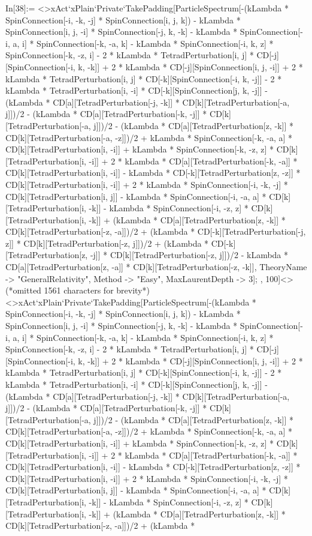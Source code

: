 In[38]:= <>xAct`xPlain`Private`TakePadding[ParticleSpectrum[-(kLambda * SpinConnection[-i, -k, -j] * SpinConnection[i, j, k]) - kLambda * SpinConnection[i, j, -i] * SpinConnection[-j, k, -k] - kLambda * SpinConnection[-i, a, i] * SpinConnection[-k, -a, k] - kLambda * SpinConnection[-i, k, z] * SpinConnection[-k, -z, i] - 2 * kLambda * TetradPerturbation[i, j] * CD[-j][SpinConnection[-i, k, -k]] + 2 * kLambda * CD[-j][SpinConnection[i, j, -i]] + 2 * kLambda * TetradPerturbation[i, j] * CD[-k][SpinConnection[-i, k, -j]] - 2 * kLambda * TetradPerturbation[i, -i] * CD[-k][SpinConnection[j, k, -j]] - (kLambda * CD[a][TetradPerturbation[-j, -k]] * CD[k][TetradPerturbation[-a, j]])/2 - (kLambda * CD[a][TetradPerturbation[-k, -j]] * CD[k][TetradPerturbation[-a, j]])/2 - (kLambda * CD[a][TetradPerturbation[z, -k]] * CD[k][TetradPerturbation[-a, -z]])/2 + kLambda * SpinConnection[-k, -a, a] * CD[k][TetradPerturbation[i, -i]] + kLambda * SpinConnection[-k, -z, z] * CD[k][TetradPerturbation[i, -i]] + 2 * kLambda * CD[a][TetradPerturbation[-k, -a]] * CD[k][TetradPerturbation[i, -i]] - kLambda * CD[-k][TetradPerturbation[z, -z]] * CD[k][TetradPerturbation[i, -i]] + 2 * kLambda * SpinConnection[-i, -k, -j] * CD[k][TetradPerturbation[i, j]] - kLambda * SpinConnection[-i, -a, a] * CD[k][TetradPerturbation[i, -k]] - kLambda * SpinConnection[-i, -z, z] * CD[k][TetradPerturbation[i, -k]] + (kLambda * CD[a][TetradPerturbation[z, -k]] * CD[k][TetradPerturbation[-z, -a]])/2 + (kLambda * CD[-k][TetradPerturbation[-j, z]] * CD[k][TetradPerturbation[-z, j]])/2 + (kLambda * CD[-k][TetradPerturbation[z, -j]] * CD[k][TetradPerturbation[-z, j]])/2 - kLambda * CD[a][TetradPerturbation[z, -a]] * CD[k][TetradPerturbation[-z, -k]], TheoryName -> "GeneralRelativity", Method -> "Easy", MaxLaurentDepth -> 3]; , 100]<>(*omitted 1561 characters for brevity*)<>xAct`xPlain`Private`TakePadding[ParticleSpectrum[-(kLambda * SpinConnection[-i, -k, -j] * SpinConnection[i, j, k]) - kLambda * SpinConnection[i, j, -i] * SpinConnection[-j, k, -k] - kLambda * SpinConnection[-i, a, i] * SpinConnection[-k, -a, k] - kLambda * SpinConnection[-i, k, z] * SpinConnection[-k, -z, i] - 2 * kLambda * TetradPerturbation[i, j] * CD[-j][SpinConnection[-i, k, -k]] + 2 * kLambda * CD[-j][SpinConnection[i, j, -i]] + 2 * kLambda * TetradPerturbation[i, j] * CD[-k][SpinConnection[-i, k, -j]] - 2 * kLambda * TetradPerturbation[i, -i] * CD[-k][SpinConnection[j, k, -j]] - (kLambda * CD[a][TetradPerturbation[-j, -k]] * CD[k][TetradPerturbation[-a, j]])/2 - (kLambda * CD[a][TetradPerturbation[-k, -j]] * CD[k][TetradPerturbation[-a, j]])/2 - (kLambda * CD[a][TetradPerturbation[z, -k]] * CD[k][TetradPerturbation[-a, -z]])/2 + kLambda * SpinConnection[-k, -a, a] * CD[k][TetradPerturbation[i, -i]] + kLambda * SpinConnection[-k, -z, z] * CD[k][TetradPerturbation[i, -i]] + 2 * kLambda * CD[a][TetradPerturbation[-k, -a]] * CD[k][TetradPerturbation[i, -i]] - kLambda * CD[-k][TetradPerturbation[z, -z]] * CD[k][TetradPerturbation[i, -i]] + 2 * kLambda * SpinConnection[-i, -k, -j] * CD[k][TetradPerturbation[i, j]] - kLambda * SpinConnection[-i, -a, a] * CD[k][TetradPerturbation[i, -k]] - kLambda * SpinConnection[-i, -z, z] * CD[k][TetradPerturbation[i, -k]] + (kLambda * CD[a][TetradPerturbation[z, -k]] * CD[k][TetradPerturbation[-z, -a]])/2 + (kLambda * 